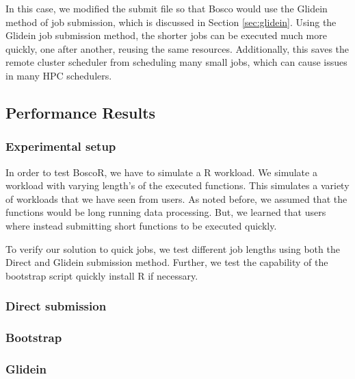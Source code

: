 \documentclass[conference]{IEEEtran}
\begin{document}
In this case, we modified the submit file so that Bosco would use the Glidein method of job submission, which is discussed in Section \ref{sec:glidein}.  Using the Glidein job submission method, the shorter jobs can be executed much more quickly, one after another, reusing the same resources.  Additionally, this saves the remote cluster scheduler from scheduling many small jobs, which can cause issues in many HPC schedulers.


\subsection{Performance Results}

\subsubsection{Experimental setup}  

In order to test BoscoR, we have to simulate a R workload.  We simulate a workload with varying length's of the executed functions.  This simulates a variety of workloads that we have seen from users.  As noted before, we assumed that the functions would be long running data processing.  But, we learned that users where instead submitting short functions to be executed quickly.  

To verify our solution to quick jobs, we test different job lengths using both the Direct and Glidein submission method.  Further, we test the capability of the bootstrap script quickly install R if necessary.

\subsubsection{Direct submission}


\subsubsection{Bootstrap}



\subsubsection{Glidein}
\end{document}

